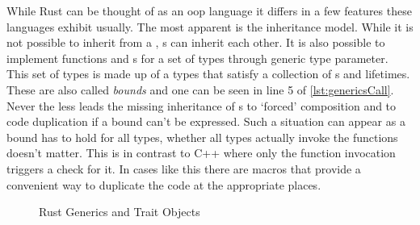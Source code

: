 \documentclass[thesis]{subfiles}
\begin{document}
    While Rust can be thought of as an \gls{oop} language it differs in a few features these languages exhibit usually.
    The most apparent is the inheritance model.
    While it is not possible to inherit from a , s can inherit each other.
    It is also possible to implement functions and s for a set of types through generic type parameter.
    This set of types is made up of a types that satisfy a collection of s and lifetimes.
    These are also called \emph{bounds} and one can be seen in line 5 of \autoref{lst:genericsCall}.
    Never the less leads the missing inheritance of s to `forced' composition and to code duplication if a bound can't be expressed.
    Such a situation can appear as a bound has to hold for all types, whether all types actually invoke the functions doesn't matter.
    This is in contrast to C++ where only the function invocation triggers a check for it.
    In cases like this there are macros that provide a convenient way to duplicate the code at the appropriate places.

    \newsavebox{\genericsBase}
    \begin{lrbox}{\genericsBase}%
      \begin{minipage}{.45\linewidth}
        
      \end{minipage}
    \end{lrbox}

    \newsavebox{\genericsCall}
    \begin{lrbox}{\genericsCall}
      \begin{minipage}{.45\linewidth}
        
      \end{minipage}
    \end{lrbox}

    \begin{figure}[ht]
      \captionsetup{type=lstlisting}
       \hfill%
      \caption{Rust Generics and Trait Objects}\label{lst:generics}
    \end{figure}
\end{document}
